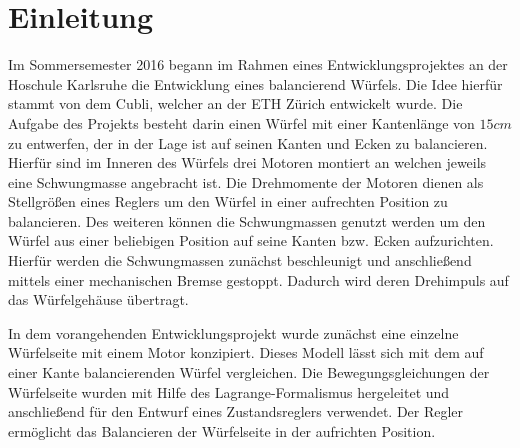 \chapter{Einleitung}
Im Sommersemester 2016 begann im Rahmen eines Entwicklungsprojektes an der Hoschule Karlsruhe die Entwicklung eines balancierend Würfels. Die Idee hierfür stammt von dem Cubli, welcher an der ETH Zürich entwickelt wurde. Die Aufgabe des Projekts besteht darin einen Würfel mit einer Kantenlänge von $15cm$ zu entwerfen, der in der Lage ist auf seinen Kanten und Ecken zu balancieren. Hierfür sind im Inneren des Würfels drei Motoren montiert an welchen jeweils eine Schwungmasse angebracht ist. Die Drehmomente der Motoren dienen als Stellgrößen eines Reglers um den Würfel in einer aufrechten Position zu balancieren. Des weiteren können die Schwungmassen genutzt werden um den Würfel aus einer beliebigen Position auf seine Kanten bzw. Ecken aufzurichten. Hierfür werden die Schwungmassen zunächst beschleunigt und anschließend mittels einer mechanischen Bremse gestoppt. Dadurch wird deren Drehimpuls auf das Würfelgehäuse übertragt.

In dem vorangehenden Entwicklungsprojekt wurde zunächst eine einzelne Würfelseite mit einem Motor konzipiert. Dieses Modell lässt sich mit dem auf einer Kante balancierenden Würfel vergleichen. Die Bewegungsgleichungen der Würfelseite wurden mit Hilfe des Lagrange-Formalismus hergeleitet und anschließend für den Entwurf eines Zustandsreglers verwendet. Der Regler ermöglicht das Balancieren der Würfelseite in der aufrichten Position.